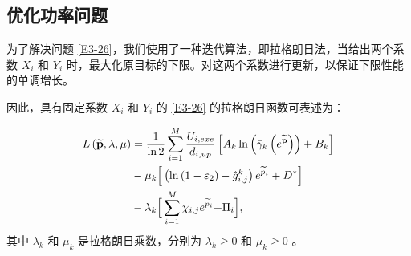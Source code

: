 \subsection{优化功率问题}\label{section3-3-3}
为了解决问题 \eqref{E3-26}，我们使用了一种迭代算法，即拉格朗日法，当给出两个系数 $X_i$ 和 $Y_i$ 时，最大化原目标的下限。对这两个系数进行更新，以保证下限性能的单调增长。

因此，具有固定系数 $X_i$ 和 $Y_i$ 的 \eqref{E3-26} 的拉格朗日函数可表述为：

\begin{align}\label{E27}
L\left(\widetilde{\mathbf{p}},\lambda,\mu\right)&=\frac{1}{\ln{2}}\sum_{i=1}^{M}{\frac{U_{i,exe}}{d_{i,up}}\left[A_k\ln{\left({\bar{\gamma}}_k\left(e^{\widetilde{\mathbf{p}}}\right)\right)}+B_k\right]}\\
&\notag-\mu_k\Big[\left(\ln\left(1-\varepsilon_2\right)-{\hat{g}}_{i,j}^k\right)e^{{\widetilde{p}}_i}+D^\ast\Big]\\
&-\lambda_k\Big[\sum_{i=1}^{M}{\chi_{i,j}e^{{\widetilde{p}}_i}}{+\mathrm{\Pi}}_i\Big]\notag,
\end{align}
其中 $\lambda_k$ 和 $\mu_k$ 是拉格朗日乘数，分别为 $\lambda_k\geq0$ 和 $\mu_k\geq0$ 。

